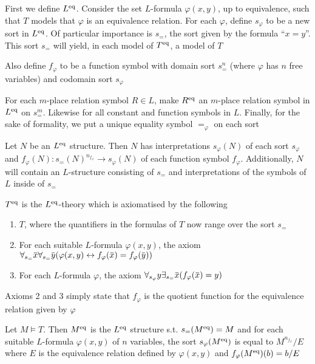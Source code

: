 \documentclass[11pt]{article}
\begin{document}
First we define \(L^{\operatorname{eq}}\). Consider the set \(L\)-formula \(\varphi(x,y)\), up to equivalence, such
that \(T\) models that \(\varphi\) is an equivalence relation. For each \(\varphi\), define \(s_\varphi\) to be a new sort
in \(L^{\operatorname{eq}}\). Of particular importance is \(s_=\), the sort given by the formula ``\(x=y\)''.
This sort \(s_=\) will yield, in each model of \(T^{\operatorname{eq}}\), a model of \(T\)

Also define \(f_\varphi\) to be a function symbol with domain sort \(s^n_=\) (where \(\varphi\) has \(n\) free
variables) and codomain sort \(s_\varphi\)

For each \(m\)-place relation symbol \(R\in L\), make \(R^{\operatorname{eq}}\) an \(m\)-place relation symbol
in \(L^{\operatorname{eq}}\) on \(s_=^m\). Likewise for all constant and function symbols in \(L\). Finally, for
the sake of formality, we put a unique equality symbol \(=_\varphi\) on each sort

\begin{remark}
Let \(N\) be an \(L^{\operatorname{eq}}\) structure. Then \(N\) has interpretations \(s_\varphi(N)\) of each
sort \(s_\varphi\) and \(f_\varphi(N):s_=(N)^{n_{f_\varphi}}\to s_\varphi(N)\) of each function symbol \(f_\varphi\).
Additionally, \(N\) will contain an \(L\)-structure consisting of \(s_=\) and interpretations of
the symbols of \(L\) inside of \(s_=\)
\end{remark}

\begin{definition}[]
\(T^{\operatorname{eq}}\) is the \(L^{\operatorname{eq}}\)-theory which is axiomatised by the following
\begin{enumerate}
\item \(T\), where the quantifiers in the formulas of \(T\) now range over the sort \(s_=\)
\item For each suitable \(L\)-formula \(\varphi(x,y)\), the axiom \(\forall_{s_=}\barx\forall_{s_=}\bary(\varphi(x,y)\leftrightarrow f_\varphi(\barx)=f_\varphi(\bary))\)
\item For each \(L\)-formula \(\varphi\), the axiom \(\forall_{s_\varphi}y\exists_{s_=}\barx(f_\varphi(\barx)=y)\)
\end{enumerate}
\end{definition}

Axioms 2 and 3 simply state that \(f_\varphi\) is the quotient function for the equivalence relation
given by \(\varphi\)

\begin{definition}[]
Let \(M\vDash T\). Then \(M^{\operatorname{eq}}\) is the \(L^{\operatorname{eq}}\) structure s.t. \(s_=(M^{\operatorname{eq}})=M\) and for each
suitable \(L\)-formula \(\varphi(x,y)\) of \(n\) variables, the sort \(s_\varphi(M^{\operatorname{eq}})\) is equal
to \(M^{n_{f_\varphi}}/E\) where \(E\) is the equivalence relation defined by \(\varphi(x,y)\) and \(f_\varphi(M^{\operatorname{eq}})(b)=b/E\)
\end{definition}
\end{document}
